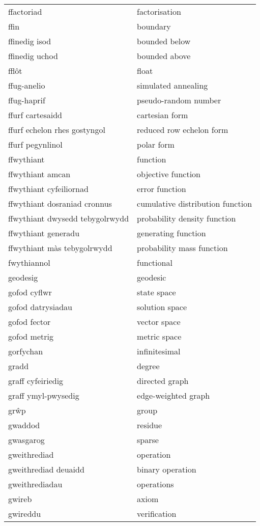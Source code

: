 \begin{supertabular}{p{0.22\textwidth}p{0.22\textwidth}}
ffactoriad & factorisation \\
ffin & boundary \\
ffinedig isod & bounded below \\
ffinedig uchod & bounded above \\
fflôt & float \\
ffug-anelio & simulated annealing \\
ffug-haprif & pseudo-random number \\
ffurf cartesaidd & cartesian form \\
ffurf echelon rhes gostyngol & reduced row echelon form \\
ffurf pegynlinol & polar form \\
ffwythiant & function \\
ffwythiant amcan & objective function \\
ffwythiant cyfeiliornad & error function \\
ffwythiant dosraniad cronnus & cumulative distribution function \\
ffwythiant dwysedd tebygolrwydd & probability density function \\
ffwythiant generadu & generating function \\
ffwythiant màs tebygolrwydd & probability mass function \\
fwythiannol & functional \\
geodesig & geodesic \\
gofod cyflwr & state space \\
gofod datrysiadau & solution space \\
gofod fector & vector space \\
gofod metrig & metric space \\
gorfychan & infinitesimal \\
gradd & degree \\
graff cyfeiriedig & directed graph \\
graff ymyl-pwysedig & edge-weighted graph \\
grŵp & group \\
gwaddod & residue \\
gwasgarog & sparse \\
gweithrediad & operation \\
gweithrediad deuaidd & binary operation \\
gweithrediadau & operations \\
gwireb & axiom \\
gwireddu & verification \\

\end{supertabular}
